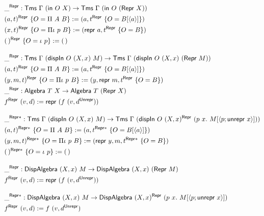 \begin{align*}
&\_^{\mta{Repr}} : \Tms\ \Gamma\ (\mta{in}\ O\ X) \to \Tms\ \Gamma\ (\mta{in}\ O\ (\mta{Repr}\ X)) \\
&(a, t)^{\mta{Repr}}\ \{O = \Pi\ A\ B\} := (a, t^\mta{Repr}\ \{O = B[\Msub a]\}) \\
&(x, t)^{\mta{Repr}}\ \{O = \Pi\iota\ p\ B\} := (\mta{repr}\ a, t^\mta{Repr}\ \{O = B\}) \\
&(\,)^{\mta{Repr}}\ \{O = \iota\ p\} := (\,) \\[1em]
&\_^{\mta{Repr}} : \Tms\ \Gamma\ (\mta{dispIn}\ O\ (X, x)\ M) \to \Tms\ \Gamma\ (\mta{dispIn}\ O\ (X, x)\ (\mta{Repr}\ M)) \\
&(a, t)^{\mta{Repr}}\ \{O = \Pi\ A\ B\} := (a, t^\mta{Repr}\ \{O = B[\Msub a]\}) \\
&(y, m, t)^{\mta{Repr}}\ \{O = \Pi\iota\ p\ B\} := (y, \mta{repr}\ m, t^\mta{Repr}\ \{O = B\}) \\
&\_^{\mta{Repr}} : \mta{Algebra}\ T\ X \to \mta{Algebra}\ T\ (\mta{Repr}\ X) \\
&f^{\mta{Repr}}\ (v, d) := \mta{repr}\ (f\ (v, d^{\mta{Unrepr}})) \\[1em]
&\_^{\mta{Repr}*} : \Tms\ \Gamma\ (\mta{dispIn}\ O\ (X, x)\ M) \to \Tms\ \Gamma\ (\mta{dispIn}\ O\ (X, x)^{\mta{Repr}}\ (p\ x .\ M[\Msub{p;\mta{unrepr}\ x}])) \\
&(a, t)^{\mta{Repr}*}\ \{O = \Pi\ A\ B\} := (a, t^{\mta{Repr}*}\ \{O = B[\Msub a]\}) \\
&(y, m, t)^{\mta{Repr}*}\ \{O = \Pi\iota\ p\ B\} := (\mta{repr}\ y, m, t^{\mta{Repr}*}\ \{O = B\}) \\
&(\,)^{\mta{Repr}*}\ \{O = \iota\ p\} := (\,) \\[1em]
&\_^{\mta{Repr}} : \mta{DispAlgebra}\ (X, x)\ M \to \mta{DispAlgebra}\ (X, x)\ (\mta{Repr}\ M) \\
&f^{\mta{Repr}}\ (v, d) := \mta{repr}\ (f\ (v, d^{\mta{Unrepr}})) \\[1em]
&\_^{\mta{Repr}*} : \mta{DispAlgebra}\ (X, x)\ M \to \mta{DispAlgebra}\ (X, x)^{\mta{Repr}}\ (p\ x .\ M[\Msub{p;\mta{unrepr}\ x}]) \\
&f^{\mta{Repr}}\ (v, d) := f\ (v, d^{\mta{Unrepr}}) \\[1em]
\end{align*}



